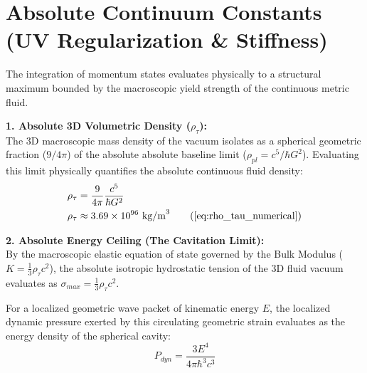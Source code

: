 \documentclass[11pt, a4paper]{article}
\begin{document}
\section{Absolute Continuum Constants (UV Regularization \& Stiffness)}
\label{sec:deriv_continuum_constants}

The integration of momentum states evaluates physically to a structural maximum bounded by the macroscopic yield strength of the continuous metric fluid.

\textbf{1. Absolute 3D Volumetric Density ($\rho_{\tau}$):} \\
The 3D macroscopic mass density of the vacuum isolates as a spherical geometric fraction ($9/4\pi$) of the absolute absolute baseline limit ($\rho_{pl} = c^5 / \hbar G^2$). Evaluating this limit physically quantifies the absolute continuous fluid density:
\begin{align}
    \rho_{\tau} &= \frac{9}{4\pi} \frac{c^5}{\hbar G^2} \label{eq:rho_tau_analytical} \\
    \rho_{\tau} &\approx 3.69 \times 10^{96} \text{ kg/m}^3 \tag{\ref{eq:rho_tau_numerical}}
\end{align}

\textbf{2. Absolute Energy Ceiling (The Cavitation Limit):} \\
By the macroscopic elastic equation of state governed by the Bulk Modulus ($K = \frac{1}{3}\rho_{\tau} c^2$), the absolute isotropic hydrostatic tension of the 3D fluid vacuum evaluates as $\sigma_{max} = \frac{1}{3}\rho_{\tau} c^2$.

For a localized geometric wave packet of kinematic energy $E$, the localized dynamic pressure exerted by this circulating geometric strain evaluates as the energy density of the spherical cavity:
\begin{equation}
    P_{dyn} = \frac{3E^4}{4\pi \hbar^3 c^3} \label{eq:dynamic_pressure}
\end{equation}
\end{document}
